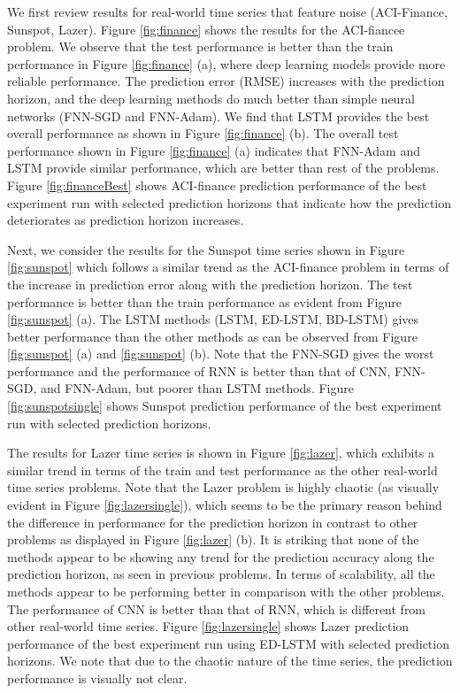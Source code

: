 \documentclass{ieeeaccess}
\begin{document}
  We first review results for real-world time series that  feature noise (ACI-Finance, Sunspot, Lazer). Figure \ref{fig:finance} shows the results for the ACI-fiancee problem. We observe that the test performance is better than the train performance in Figure \ref{fig:finance} (a), where deep learning models provide more reliable performance. The prediction error (RMSE) increases with the prediction horizon, and the deep learning methods do much better than simple neural networks (FNN-SGD and FNN-Adam). We find that LSTM provides the best overall   performance as shown in Figure \ref{fig:finance} (b).  The overall test performance shown in Figure \ref{fig:finance} (a) indicates that FNN-Adam  and  LSTM  provide similar performance, which are better than rest of the problems.  Figure \ref{fig:financeBest} shows ACI-finance prediction performance of the best experiment run with selected prediction horizons that indicate how the prediction deteriorates  as prediction horizon increases. 

Next, we consider the results for the  Sunspot time series  shown in Figure \ref{fig:sunspot} which follows a similar trend as the ACI-finance problem in terms of the increase in prediction error along with the prediction horizon. The test performance is better than the train performance as evident from Figure \ref{fig:sunspot} (a). The LSTM methods (LSTM, ED-LSTM, BD-LSTM) gives better performance than the other methods as can be observed from Figure \ref{fig:sunspot} (a) and \ref{fig:sunspot} (b). Note that the FNN-SGD gives the worst performance and the performance of RNN is better than that of CNN, FNN-SGD, and FNN-Adam, but poorer than LSTM methods. Figure \ref{fig:sunspotsingle}  shows Sunspot prediction performance of the best experiment run with selected prediction horizons. 


The results for  Lazer time series  is shown in Figure \ref{fig:lazer}, which exhibits a similar trend in terms of the train and test performance as the other real-world time series problems. Note that the Lazer problem is highly chaotic (as visually evident in Figure \ref{fig:lazersingle}), which seems to be the primary reason behind the difference in performance for the prediction horizon in contrast to other problems as displayed in Figure \ref{fig:lazer} (b). It is striking that none of the methods appear to be showing any trend for the prediction accuracy along the prediction horizon, as seen in previous problems. In terms of scalability, all the methods appear to be performing better in comparison with the other problems. The performance of CNN is better than that of RNN, which is different from other real-world time series. Figure \ref{fig:lazersingle}  shows Lazer prediction performance of the best experiment run using ED-LSTM with selected prediction horizons. We note that due to the chaotic nature of the time series, the prediction performance is visually not clear. 
 
\end{document}
